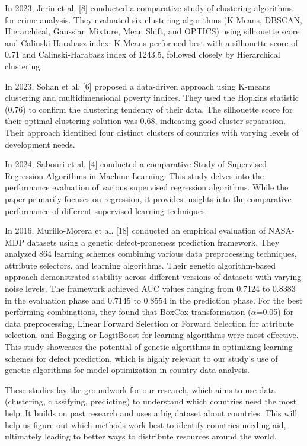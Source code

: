 \documentclass{article}
\begin{document}
\begin{multicols}{2}
In 2023, Jerin et al. [8] conducted a comparative study of clustering algorithms for crime analysis. They evaluated six clustering algorithms (K-Means, DBSCAN, Hierarchical, Gaussian Mixture, Mean Shift, and OPTICS) using silhouette score and Calinski-Harabasz index. K-Means performed best with a silhouette score of 0.71 and Calinski-Harabasz index of 1243.5, followed closely by Hierarchical clustering.

In 2023, Sohan et al. [6] proposed a data-driven approach using K-means clustering and multidimensional poverty indices. They used the Hopkins statistic (0.76) to confirm the clustering tendency of their data. The silhouette score for their optimal clustering solution was 0.68, indicating good cluster separation. Their approach identified four distinct clusters of countries with varying levels of development needs.

In 2024, Sabouri et al. [4] conducted a comparative Study of Supervised Regression Algorithms in Machine Learning: This study delves into the performance evaluation of various supervised regression algorithms. While the paper primarily focuses on regression, it provides insights into the comparative performance of different supervised learning techniques. 

In 2016, Murillo-Morera et al. [18] conducted an empirical evaluation of NASA-MDP datasets using a genetic defect-proneness prediction framework. They analyzed 864 learning schemes combining various data preprocessing techniques, attribute selectors, and learning algorithms. Their genetic algorithm-based approach demonstrated stability across different versions of datasets with varying noise levels. The framework achieved AUC values ranging from 0.7124 to 0.8383 in the evaluation phase and 0.7145 to 0.8554 in the prediction phase. For the best performing combinations, they found that BoxCox transformation (\(\alpha\)=0.05) for data preprocessing, Linear Forward Selection or Forward Selection for attribute selection, and Bagging or LogitBoost for learning algorithms were most effective. This study showcases the potential of genetic algorithms in optimizing learning schemes for defect prediction, which is highly relevant to our study's use of genetic algorithms for model optimization in country data analysis.

These studies lay the groundwork for our research, which aims to use data (clustering, classifying, predicting) to understand which countries need the most help. It builds on past research and uses a big dataset about countries. This will help us figure out which methods work best to identify countries needing aid, ultimately leading to better ways to distribute resources around the world.


\end{multicols}
\end{document}
